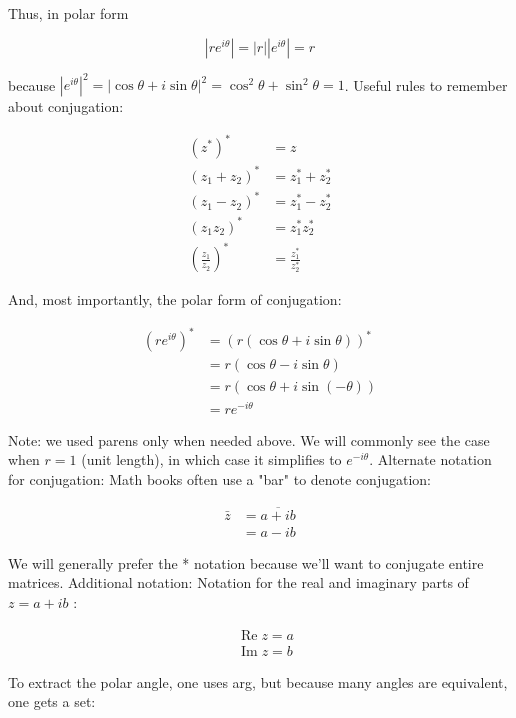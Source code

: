 \documentclass[main.tex]{subfiles}
\begin{document}
    Thus, in polar form
    
    $$\left|r e^{i \theta}\right|=|r|\left|e^{i \theta}\right|=r$$
    
    because $\left|e^{i \theta}\right|^{2}=|\cos \theta+i \sin \theta|^{2}=\cos ^{2} \theta+\sin ^{2} \theta=1$. Useful rules to remember about conjugation:
    
    \begin{align*}
    \left(z^{*}\right)^{*} &=z \\
    \left(z_{1}+z_{2}\right)^{*} &=z_{1}^{*}+z_{2}^{*} \\
    \left(z_{1}-z_{2}\right)^{*} &=z_{1}^{*}-z_{2}^{*} \\
    \left(z_{1} z_{2}\right)^{*} &=z_{1}^{*} z_{2}^{*} \\
    \left(\frac{z_{1}}{z_{2}}\right)^{*} &=\frac{z_{1}^{*}}{z_{2}^{*}}
    \end{align*}
    
    And, most importantly, the polar form of conjugation:
    
    $$
    \begin{aligned}
    \left(r e^{i \theta}\right)^{*} &=(r(\cos \theta+i \sin \theta))^{*} \\
    &=r(\cos \theta-i \sin \theta) \\
    &=r(\cos \theta+i \sin (-\theta)) \\
    &=r e^{-i \theta}
    \end{aligned}
    $$
    
    Note: we used parens only when needed above. We will commonly see the case when $r=1$ (unit length), in which case it simplifies to $e^{-i \theta}$. Alternate notation for conjugation: Math books often use a "bar" to denote conjugation:
    
    $$
    \begin{aligned}
    \bar{z} &=\overline{a+i b} \\
    &=a-i b
    \end{aligned}
    $$
    
    We will generally prefer the * notation because we'll want to conjugate entire matrices. Additional notation: Notation for the real and imaginary parts of $z=a+i b$ :
    
    $$
    \begin{aligned}
    &\operatorname{Re} z=a \\
    &\operatorname{Im} z=b
    \end{aligned}
    $$
    
    To extract the polar angle, one uses arg, but because many angles are equivalent, one gets a set:
    
\end{document}
